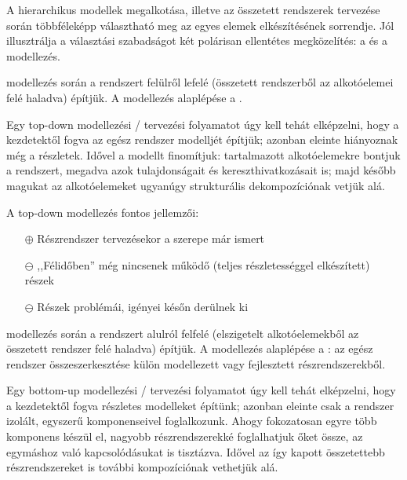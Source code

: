 A hierarchikus modellek megalkotása, illetve az összetett rendszerek tervezése során többféleképp választható meg az egyes elemek elkészítésének sorrendje. Jól illusztrálja a választási szabadságot két polárisan ellentétes megközelítés: a  és a  modellezés.

\begin{definicio}
	 modellezés során a rendszert felülről lefelé (összetett rendszerből az alkotóelemei felé haladva) építjük. A modellezés alaplépése a .
\end{definicio}

Egy top-down modellezési / tervezési folyamatot úgy kell tehát elképzelni, hogy a kezdetektől fogva az egész rendszer modelljét építjük; azonban eleinte hiányoznak még a részletek. Idővel a modellt finomítjuk: tartalmazott alkotóelemekre bontjuk a rendszert, megadva azok tulajdonságait és kereszthivatkozásait is; majd később magukat az alkotóelemeket ugyanúgy strukturális dekompozíciónak vetjük alá. 

A top-down modellezés fontos jellemzői:

\begin{itemize}
	\item[$\oplus$] Részrendszer tervezésekor a szerepe már ismert
	\item[$\ominus$] ,,Félidőben'' még nincsenek működő (teljes részletességgel elkészített) részek
	\item[$\ominus$] Részek problémái, igényei későn derülnek ki
\end{itemize}

\begin{definicio}
	 modellezés során a rendszert alulról felfelé (elszigetelt alkotóelemekből az összetett rendszer felé haladva) építjük. A modellezés alaplépése a : az egész rendszer összeszerkesztése külön modellezett vagy fejlesztett részrendszerekből.
\end{definicio}

Egy bottom-up modellezési / tervezési folyamatot úgy kell tehát elképzelni, hogy a kezdetektől fogva részletes modelleket építünk; azonban eleinte csak a rendszer izolált, egyszerű komponenseivel foglalkozunk. Ahogy fokozatosan egyre több komponens készül el, nagyobb részrendszerekké foglalhatjuk őket össze, az egymáshoz való kapcsolódásukat is tisztázva. Idővel az így kapott összetettebb részrendszereket is további kompozíciónak vethetjük alá. 

